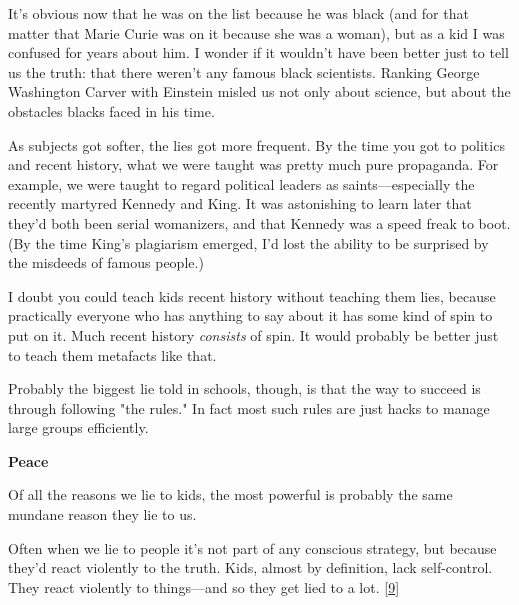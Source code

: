 It's obvious now that he was on the
                  list because he was black (and for that matter that Marie
                  Curie was on it because she was a woman), but as a kid I was
                  confused for years about him. I wonder if it wouldn't have
                  been better just to tell us the truth: that there weren't any
                  famous black scientists. Ranking George Washington Carver with
                  Einstein misled us not only about science, but about the
                  obstacles blacks faced in his time.

As subjects got
                  softer, the lies got more frequent. By the time you got to
                  politics and recent history, what we were taught was pretty
                  much pure propaganda. For example, we were taught to regard
                  political leaders as saints---especially the recently
                  martyred Kennedy and King. It was astonishing to learn later
                  that they'd both been serial womanizers, and that Kennedy was
                  a speed freak to boot. (By the time King's plagiarism emerged,
                  I'd lost the ability to be surprised by the misdeeds of famous
                  people.)

I doubt you could teach kids recent
                  history without teaching them lies, because practically
                  everyone who has anything to say about it has some kind of
                  spin to put on it. Much recent history \emph{consists} of
                  spin. It would probably be better just to teach them metafacts
                  like that.

Probably the biggest lie told in
                  schools, though, is that the way to succeed is through
                  following "the rules." In fact most such rules are just hacks
                  to manage large groups efficiently.


                  \textbf{Peace}

Of all the reasons we lie to kids, the
                  most powerful is probably the same mundane reason they lie to
                  us.

Often when we lie to people it's not part of
                  any conscious strategy, but because they'd react violently to
                  the truth. Kids, almost by definition, lack self-control. They
                  react violently to things---and so they get lied to a lot.
                  [\href{\#f9n}{9}]

